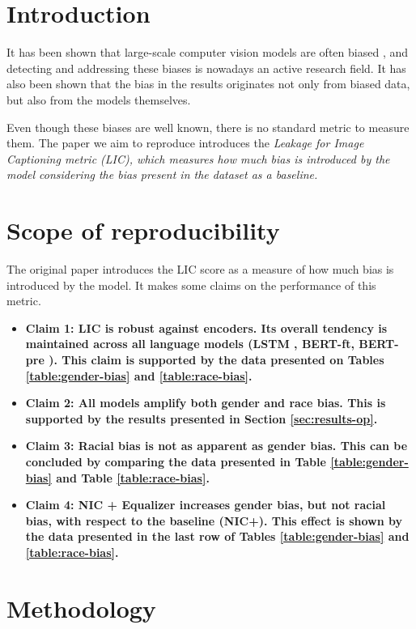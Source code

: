 
\section{Introduction} 
It has been shown that large-scale computer vision models are often biased \cite{GenderShades}, and detecting and addressing these biases is nowadays an active research field. It has also been shown \cite{Data-feminism} that the bias in the results originates not only from biased data, but also from the models themselves.

Even though these biases are well known, there is no standard metric to measure them. The paper we aim to reproduce \cite{Hirota2022} introduces the \it Leakage for Image Captioning \rm metric (LIC), which measures how much bias is introduced by the model considering the bias present in the dataset as a baseline.

\section{Scope of reproducibility}
\label{sec:claims}
The original paper \cite{Hirota2022} introduces the LIC score as a measure of how much bias is introduced by the model. It makes some claims on the performance of this metric.
\begin{itemize}
    \item \bf Claim 1: \rm LIC is robust against encoders. Its overall tendency is maintained across all language models (LSTM \cite{LSTM}, BERT-ft, BERT-pre \cite{BERT}). This claim is supported by the data presented on Tables \ref{table:gender-bias} and \ref{table:race-bias}.
    \item \bf Claim 2: \rm All models amplify both gender and race bias. This is supported by the results presented in Section \ref{sec:results-op}.
    \item \bf Claim 3: \rm Racial bias is not as apparent as gender bias. This can be concluded by comparing the data presented in Table \ref{table:gender-bias} and Table \ref{table:race-bias}.
    \item \bf Claim 4: \rm NIC + Equalizer \cite{Burns2018} increases gender bias, but not racial bias, with respect to the baseline (NIC+). This effect is shown by the data presented in the last row of Tables \ref{table:gender-bias} and \ref{table:race-bias}.
\end{itemize}

\section{Methodology}

